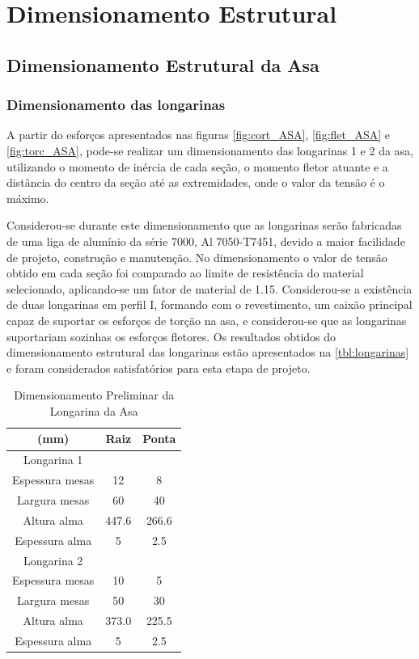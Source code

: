 \chapter{Dimensionamento Estrutural}

\section{Dimensionamento Estrutural da Asa}

\subsection{Dimensionamento das longarinas}
A partir do esforços apresentados nas figuras \ref{fig:cort_ASA}, \ref{fig:flet_ASA} e \ref{fig:torc_ASA}, pode-se realizar um dimensionamento das longarinas 1 e 2 da asa, utilizando o momento de inércia de cada seção, o momento fletor atuante e a distância do centro da seção até as extremidades, onde o valor da tensão é o máximo.

Considerou-se durante este dimensionamento que as longarinas serão fabricadas de uma liga de alumínio da série 7000, Al 7050-T7451, devido a maior facilidade de projeto, construção e manutenção. No dimensionamento o valor de tensão obtido em cada seção foi comparado ao limite de resistência do material selecionado, aplicando-se um fator de material de 1.15.
Considerou-se a existência de duas longarinas em perfil I, formando com o revestimento, um caixão principal capaz de suportar os esforços de torção na asa, e considerou-se que as longarinas suportariam sozinhas os esforços fletores.
Os resultados obtidos do dimensionamento estrutural das longarinas estão apresentados na \autoref{tbl:longarinas} e foram considerados satisfatórios para esta etapa de projeto.


\begin{table}[H]
\centering
\begin{tabular}{ccc}
\toprule
(mm) & Raiz & Ponta \\ \midrule
Longarina 1 &  &   \\ \midrule
Espessura mesas & 12 & 8 \\
Largura mesas & 60 & 40\\
Altura alma & 447.6 & 266.6 \\
Espessura alma & 5 & 2.5 \\ \midrule
Longarina 2 &  &   \\ \midrule
Espessura mesas & 10 & 5 \\
Largura mesas & 50 & 30 \\
Altura alma & 373.0 & 225.5 \\
Espessura alma & 5 & 2.5 \\
\bottomrule
\end{tabular}
\caption{Dimensionamento Preliminar da Longarina da Asa}
\label{tbl:longarinas2}
\end{table}

